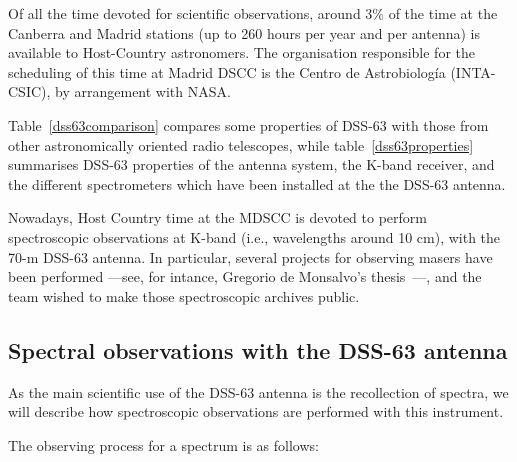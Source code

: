 		Of all the time devoted for scientific observations,
		around 3\% of the time at the Canberra and Madrid stations
		(up to 260 hours per year and per antenna) is available to
		Host-Country astronomers.  The
		organisation responsible for the scheduling of this time at
		Madrid DSCC is the Centro de Astrobiología (INTA-CSIC), by
		arrangement with NASA.
		
		Table~\ref{dss63comparison} compares some properties of
		DSS-63 with those from other astronomically oriented radio
		telescopes, while table~\ref{dss63properties} summarises
		DSS-63 properties of the antenna system, the K-band receiver,
		and the different spectrometers which have been installed at
		the the DSS-63 antenna.
		
		Nowadays, Host Country time at the MDSCC is devoted to
		perform spectroscopic observations at K-band (i.e.,
		wavelengths around 10 cm), with the 70-m DSS-63 antenna.
		In particular, several projects for observing \water{}
		masers have been performed ---see, for intance, Gregorio de
		Monsalvo's thesis~\cite{de-Gregorio-Monsalvo:2006fk}---,
		and the team wished to make those spectroscopic archives
		public.
		
		\subsection{Spectral observations with the DSS-63 antenna}
		\label{sub:spectral_observations_dss63}
			As the main scientific use of the DSS-63 antenna is the
			recollection of spectra, we will describe how
			spectroscopic observations are performed with this
			instrument.
			
			The observing process for a spectrum is as follows:
			
